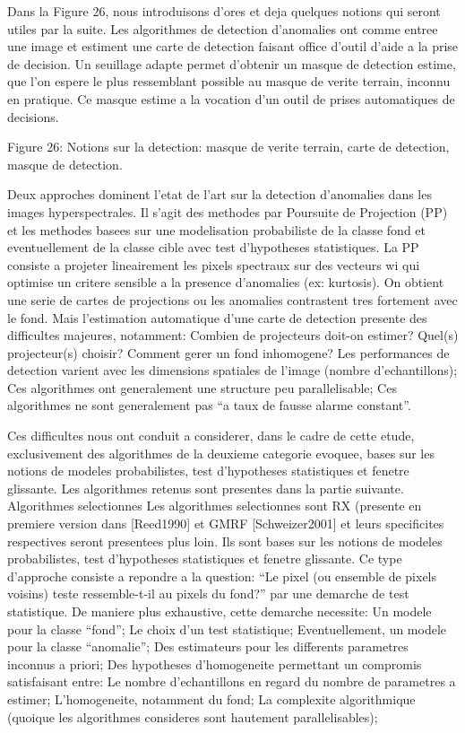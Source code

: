 Dans la Figure 26, nous introduisons d'ores et deja quelques notions
qui seront utiles par la suite. Les algorithmes de detection
d'anomalies ont comme entree une image et estiment une carte de
detection faisant office d'outil d'aide a la prise de decision. Un
seuillage adapte permet d'obtenir un masque de detection estime, que
l'on espere le plus ressemblant possible au masque de verite terrain,
inconnu en pratique. Ce masque estime a la vocation d'un outil de
prises automatiques de decisions.

Figure 26: Notions sur la detection: masque de verite terrain, carte
de detection, masque de detection.

Deux approches dominent l'etat de l'art sur la detection d'anomalies
dans les images hyperspectrales. Il s'agit des methodes par Poursuite
de Projection (PP) et les methodes basees sur une modelisation
probabiliste de la classe fond et eventuellement de la classe cible
avec test d'hypotheses statistiques.  La PP consiste a projeter
lineairement les pixels spectraux sur des vecteurs wi qui optimise un
critere sensible a la presence d'anomalies (ex: kurtosis). On obtient
une serie de cartes de projections ou les anomalies contrastent tres
fortement avec le fond. Mais l'estimation automatique d'une carte de
detection presente des difficultes majeures, notamment: Combien de
projecteurs doit-on estimer?  Quel(s) projecteur(s) choisir?  Comment
gerer un fond inhomogene?  Les performances de detection varient avec
les dimensions spatiales de l'image (nombre d'echantillons); Ces
algorithmes ont generalement une structure peu parallelisable; Ces
algorithmes ne sont generalement pas ``a taux de fausse alarme
  constant''.

Ces difficultes nous ont conduit a considerer, dans le cadre de cette
etude, exclusivement des algorithmes de la deuxieme categorie evoquee,
bases sur les notions de modeles probabilistes, test d'hypotheses
statistiques et fenetre glissante. Les algorithmes retenus sont
presentes dans la partie suivante.  Algorithmes selectionnes Les
algorithmes selectionnes sont RX (presente en premiere version dans
[Reed1990] et GMRF [Schweizer2001] et leurs specificites respectives
seront presentees plus loin. Ils sont bases sur les notions de modeles
probabilistes, test d'hypotheses statistiques et fenetre glissante.
Ce type d'approche consiste a repondre a la question: ``Le pixel (ou
  ensemble de pixels voisins) teste ressemble-t-il au pixels du
  fond?'' par une demarche de test statistique. De maniere plus
exhaustive, cette demarche necessite: Un modele pour la classe
``fond''; Le choix d'un test statistique; Eventuellement, un modele
pour la classe ``anomalie''; Des estimateurs pour les differents
parametres inconnus a priori; Des hypotheses d'homogeneite permettant
un compromis satisfaisant entre: Le nombre d'echantillons en regard du
nombre de parametres a estimer; L'homogeneite, notamment du fond; La
complexite algorithmique (quoique les algorithmes consideres sont
hautement parallelisables);

